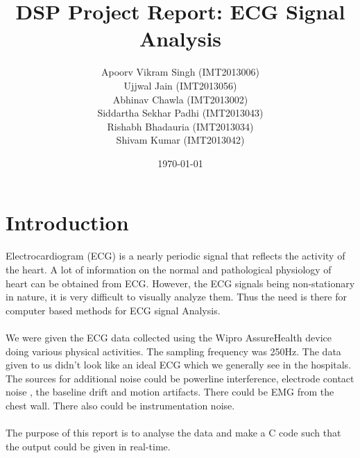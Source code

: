 \documentclass{article}
\title{DSP Project Report: ECG Signal Analysis}
\author{Apoorv Vikram Singh (IMT2013006) \\ Ujjwal Jain (IMT2013056) \\ Abhinav Chawla (IMT2013002) \\ Siddartha Sekhar Padhi (IMT2013043) \\ Rishabh Bhadauria (IMT2013034) \\ Shivam Kumar (IMT2013042) }
\date{\today}
\begin{document}
\maketitle

\section{Introduction}
Electrocardiogram (ECG) is a nearly periodic signal that reflects the activity of the
heart. A lot of information on the normal and pathological physiology of heart can be
obtained from ECG. However, the ECG signals being non-stationary in nature, it is very
difficult to visually analyze them. Thus the need is there for computer based methods for
ECG signal Analysis. \\ \\
We were given the ECG data collected using the Wipro AssureHealth device doing
various physical activities. The sampling frequency was 250Hz. The data given to
us didn't look like an ideal ECG which we generally see in the hospitals. The
sources for additional noise could be powerline interference, electrode contact
noise , the baseline drift and motion artifacts. There could be EMG from the
chest wall. There also could be instrumentation noise. \\ \\
The purpose of this report is to analyse the data and make a C code such that
the output could be given in real-time. 
\end{document}
